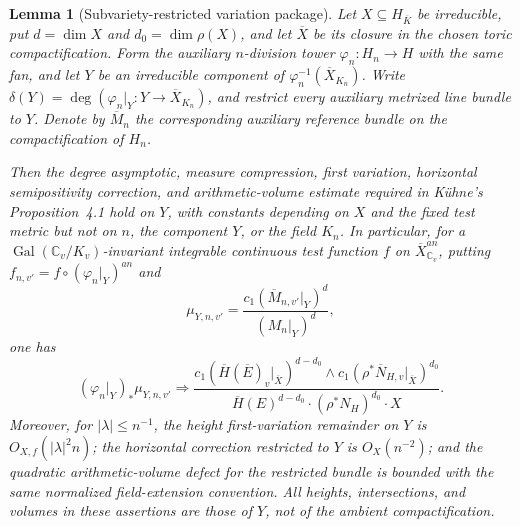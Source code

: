 \documentclass[10pt,a4paper]{amsart}
\theoremstyle{plain}
\newtheorem{lemma}[theorem]{Lemma}
\theoremstyle{plain}
\numberwithin{equation}{section}
\providecommand{\bN}{\overline{N}}
\providecommand{\bE}{\overline{E}}
\providecommand{\bM}{\overline{M}}
\begin{document}
\begin{lemma}[Subvariety-restricted variation package]
	\label{lem:subvariety-restricted-kuhne-package}
	Let \(X\subseteq H_{\overline K}\) be irreducible, put
	\(d=\dim X\) and \(d_0=\dim\rho(X)\), and let \(\overline X\) be its
	closure in the chosen toric compactification.  Form the auxiliary
	\(n\)-division tower \(\varphi_n:H_n\to H\) with the same fan, and let
	\(Y\) be an irreducible component of
	\(\varphi_n^{-1}(\overline X_{K_n})\).  Write
	\(\delta(Y)=\deg(\varphi_n|_Y:Y\to\overline X_{K_n})\), and restrict every
	auxiliary metrized line bundle to \(Y\).  Denote by \(\bM_n\) the
	corresponding auxiliary reference bundle on the compactification of \(H_n\).
	
	Then the degree asymptotic, measure compression, first variation, horizontal
	semipositivity correction, and arithmetic-volume estimate required in
	K\"uhne's Proposition~4.1 hold on \(Y\), with constants depending on
	\(X\) and the fixed test metric but not on \(n\), the component \(Y\), or
	the field \(K_n\).  In particular, for a
	\(\operatorname{Gal}(\mathbb C_v/K_v)\)-invariant integrable continuous test
	function \(f\) on \(\overline X^{an}_{\mathbb C_v}\), putting
	\(f_{n,v'}=f\circ(\varphi_n|_Y)^{an}\) and
	\[
	\mu_{Y,n,v'}=
	\frac{c_1(\bM_{n,v'}|_Y)^d}{(M_n|_Y)^d},
	\]
	one has
	\[
	(\varphi_n|_Y)_*\mu_{Y,n,v'}\Longrightarrow
	\frac{
		c_1(\overline H(\bE)_v|_{\overline X})^{d-d_0}\wedge
		c_1(\rho^*\bN_{H,v}|_{\overline X})^{d_0}
	}{
		\overline H(E)^{d-d_0}\cdot(\rho^*N_H)^{d_0}\cdot X
	}.
	\]
	Moreover, for \(|\lambda|\le n^{-1}\), the height first-variation remainder
	on \(Y\) is \(O_{X,f}(|\lambda|^2n)\); the horizontal correction restricted
	to \(Y\) is \(O_X(n^{-2})\); and the quadratic arithmetic-volume defect for
	the restricted bundle is bounded with the same normalized field-extension
	convention.  All heights, intersections, and volumes in these assertions are
	those of \(Y\), not of the ambient compactification.
\end{lemma}
\end{document}

